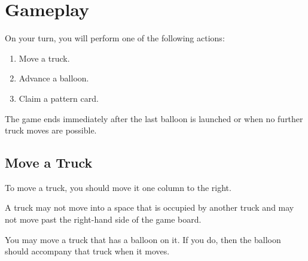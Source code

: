 \documentclass[a6paper, 11pt, parskip=half, DIV=15]{scrartcl}
\begin{document}
\newpage
\enlargethispage{1.75\baselineskip}
\section*{Gameplay}
On your turn, you will perform one of the following actions:
\begin{enumerate}[nosep]
  \item Move a truck.
  \item Advance a balloon.
  \item Claim a pattern card.
\end{enumerate}


The game ends immediately after the last balloon is launched or when no further truck moves are possible.


\subsection*{Move a Truck}
To move a truck, you should move it one column to the right.

A truck may not move into a space that is occupied by another truck and may not move past the right-hand side of the game board.

You may move a truck that has a balloon on it. If you do, then the balloon should accompany that truck when it moves.

%
%
\end{document}
